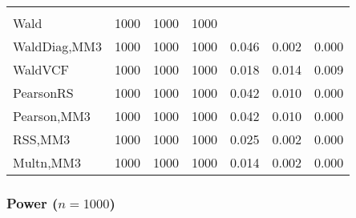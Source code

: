 \documentclass[
]{article}
\begin{document}
\begin{table}[H]
{\begin{tabular}[t]{lrrrrrr}
\addlinespace[0.3em]
\multicolumn{7}{l}{\textbf{3F 15V}}\\
\hspace{1em}Wald & 1000 & 1000 & 1000 &  &  & \\
\hspace{1em}WaldDiag,MM3 & 1000 & 1000 & 1000 & 0.046 & 0.002 & 0.000\\
\hspace{1em}WaldVCF & 1000 & 1000 & 1000 & 0.018 & 0.014 & 0.009\\
\hspace{1em}PearsonRS & 1000 & 1000 & 1000 & 0.042 & 0.010 & 0.000\\
\hspace{1em}Pearson,MM3 & 1000 & 1000 & 1000 & 0.042 & 0.010 & 0.000\\
\hspace{1em}RSS,MM3 & 1000 & 1000 & 1000 & 0.025 & 0.002 & 0.000\\
\hspace{1em}Multn,MM3 & 1000 & 1000 & 1000 & 0.014 & 0.002 & 0.000\\
\bottomrule
\end{tabular}}
\endgroup{}
\end{table}

\hypertarget{power-n1000-3}{%
\subsubsection{\texorpdfstring{Power
(\(n=1000\))}{Power (n=1000)}}\label{power-n1000-3}}
\end{document}
